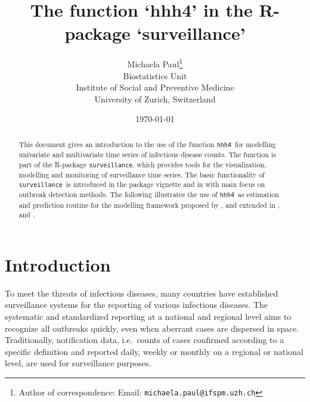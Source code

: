 \documentclass[a4paper,11pt]{article}
\title{The function `hhh4' in the R-package `surveillance'}  %
\author{
Michaela Paul\thanks{Author of correspondence: Email: \texttt{michaela.paul@ifspm.uzh.ch}}\\
Biostatistics Unit\\
Institute of Social and Preventive Medicine\\
University of Zurich, Switzerland
}
\date{\today}
\newcommand{\surveillance}{\texttt{surveillance}}
\newcommand{\hhh}{\texttt{hhh4}}
\newcommand{\R}{\textsf{R}}
\begin{document}









\maketitle  

\begin{abstract}
  \noindent This document gives an introduction to the use of the function 
  \hhh\ for modelling univariate and multivariate time series of infectious 
  disease counts. The function is part of the \R-package \surveillance, 
  which provides tools for the visualization, modelling and monitoring of 
  surveillance time series. 
  The basic functionality of \surveillance\ is introduced in 
  the package vignette \citep{vignette} and in \cite{hoehle-2007} with main 
  focus on outbreak detection methods. The following illustrates the use 
  of \hhh\ as estimation and prediction routine for the modelling framework 
  proposed by \citet{held-etal-2005}, and extended in \citet{paul-etal-2008}, 
  \citet{paul-held-2010} and \citet{herzog-etal-2010}.
\end{abstract}


\section{Introduction}\label{sec:intro}

To meet the threats of infectious diseases, many countries have established
surveillance systems for the reporting of various infectious diseases.
The systematic and standardized reporting at a national and regional level 
aims to recognize all outbreaks quickly, even when aberrant cases are 
dispersed in space. Traditionally, notification data, i.e.\ counts of cases 
confirmed according to a specific definition and reported daily, weekly or 
monthly on a regional or national level, are used for surveillance purposes.
\end{document}
